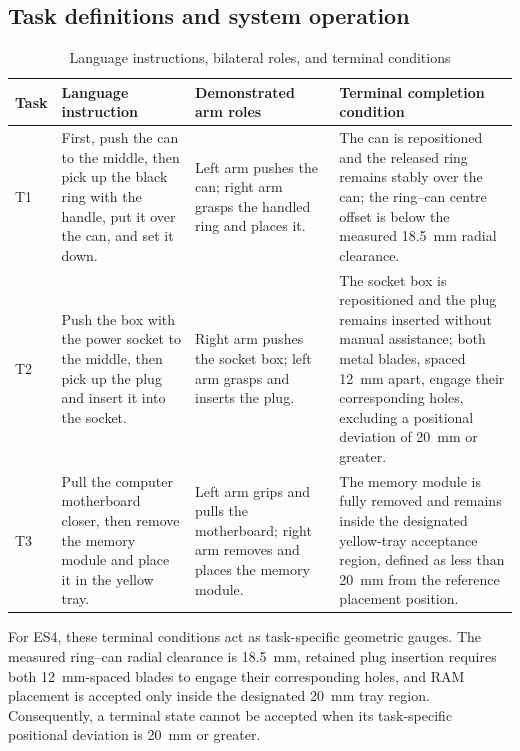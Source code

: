 \subsection{Task definitions and system operation}

\begin{table}[htbp]
  \centering
  \caption{Language instructions, bilateral roles, and terminal conditions}
  \label{tab:ch4-task-definitions}
  \label{tab:pi05-tasks}
  \footnotesize
  \begin{tabularx}{\textwidth}{
    >{\centering\arraybackslash}p{}
    >{\raggedright\arraybackslash}p{}
    >{\raggedright\arraybackslash}p{}
    X}
    \toprule
    \textbf{Task} & \textbf{Language instruction} & \textbf{Demonstrated arm roles} & \textbf{Terminal completion condition} \\
    \midrule
    T1 &
    First, push the can to the middle, then pick up the black ring with the handle, put it over the can, and set it down. &
    Left arm pushes the can; right arm grasps the handled ring and places it. &
    The can is repositioned and the released ring remains stably over the can; the ring--can centre offset is below the measured 18.5~mm radial clearance. \\
    \addlinespace
    T2 &
    Push the box with the power socket to the middle, then pick up the plug and insert it into the socket. &
    Right arm pushes the socket box; left arm grasps and inserts the plug. &
    The socket box is repositioned and the plug remains inserted without manual assistance; both metal blades, spaced 12~mm apart, engage their corresponding holes, excluding a positional deviation of 20~mm or greater. \\
    \addlinespace
    T3 &
    Pull the computer motherboard closer, then remove the memory module and place it in the yellow tray. &
    Left arm grips and pulls the motherboard; right arm removes and places the memory module. &
    The memory module is fully removed and remains inside the designated yellow-tray acceptance region, defined as less than 20~mm from the reference placement position. \\
    \bottomrule
\end{tabularx}
\end{table}

For ES4, these terminal conditions act as task-specific geometric gauges. The
measured ring--can radial clearance is 18.5~mm, retained plug insertion requires
both 12~mm-spaced blades to engage their corresponding holes, and RAM placement is accepted only
inside the designated 20~mm tray region. Consequently, a terminal state cannot
be accepted when its task-specific positional deviation is 20~mm or greater.

